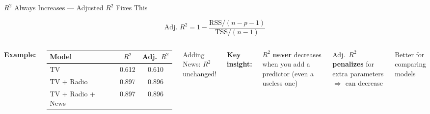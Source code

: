 \documentclass[aspectratio=169, 11pt]{beamer}
\begin{document}
\begin{frame}{$R^2$ Always Increases --- Adjusted $R^2$ Fixes This}

$$\text{Adj.\ } R^2 = 1 - \frac{\text{RSS}/(n-p-1)}{\text{TSS}/(n-1)}$$

\vspace{0.3em}
\begin{columns}
\textbf{Example:}

\begin{tabular}{lcc}
\toprule
Model & $R^2$ & Adj.\ $R^2$ \\
\midrule
TV & 0.612 & 0.610 \\
TV + Radio & 0.897 & 0.896 \\
TV + Radio + News & 0.897 & 0.896 \\
\bottomrule
\end{tabular}

\vspace{0.3em}
Adding News: $R^2$ unchanged!

\textbf{Key insight:}

$R^2$ \textbf{never} decreases when you add a predictor (even a useless one)

\vspace{0.3em}
Adj.\ $R^2$ \textbf{penalizes} for extra parameters $\Rightarrow$ can decrease

\vspace{0.3em}
Better for comparing models
\end{columns}
\end{frame}
\end{document}
